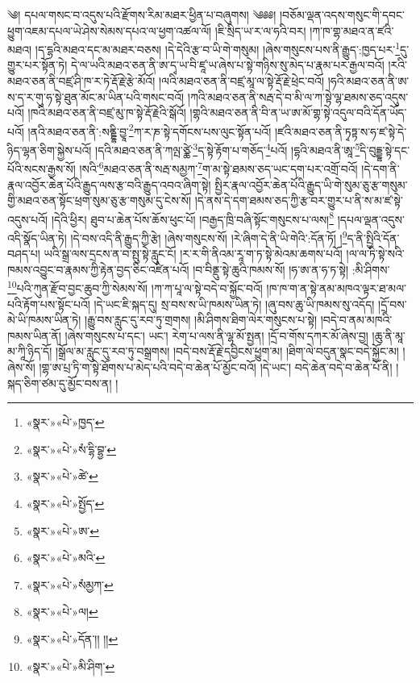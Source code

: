  ༄། དཔལ་གསང་བ་འདུས་པའི་རྫོགས་རིམ་མཐར་ཕྱིན་པ་བཞུགས། ༄༅༅། །བཅོམ་ལྡན་འདས་གསུང་གི་དབང་ཕྱུག་འཇམ་དཔལ་ཡེ་ཤེས་སེམས་དཔའ་ལ་ཕྱག་འཚལ་ལོ། །ཇི་སྲིད་ཡ་ར་ལ་ཧའི་བར། །ཀ་ཁ་གྷ་མཐའ་ན་ཛའི་མཐའ། །ད་དྷའི་མཐའ་དང་མ་མཐར་བཅས། །དེ་དེའི་རྩ་བ་ཡི་གེ་གསུམ། །ཞེས་གསུངས་པས་ནི་རྒྱུད་:ཁྱད་པར་\footnote{«སྣར་»«པེ་»ཁྱད་}དུ་གྱུར་པར་སྟོན་ཏེ། དེ་ལ་ཡའི་མཐའ་ཅན་ནི་ཨ་དྭ་ཡ་བི་ཛཱ་ཡ་ཞེས་པ་སྟེ་གཉིས་སུ་མེད་པ་རྣམ་པར་རྒྱལ་བའོ། །རའི་མཐའ་ཅན་ནི་བཛྲ་ཤི་ཁ་ར་ཏེ་རྡོ་རྗེ་རྩེ་མོའོ། །ལའི་མཐའ་ཅན་ནི་བཛྲ་མཱ་ལ་སྟེ་རྡོ་རྗེ་ཕྲེང་བའོ། །ཧའི་མཐའ་ཅན་ནི་ཨ་ས་ད་ར་གུ་ཧ་སྟེ་ཐུན་མོང་མ་ཡིན་པའི་གསང་བའོ། །ཀའི་མཐའ་ཅན་ནི་སརྦ་དེ་བ་མི་ལ་ཀ་སྟེ་ལྷ་ཐམས་ཅད་འདུས་པའོ། །ཁའི་མཐའ་ཅན་ནི་བཛྲ་མུ་ཁ་སྟེ་རྡོ་རྗེའི་སྒོའོ། །གྷའི་མཐའ་ཅན་ནི་བི་ན་ཡ་ཨ་མོ་གྷ་སྟེ་འདུལ་བའི་དོན་ཡོད་པའོ། །ནའི་མཐའ་ཅན་ནི་:སནྡྷི་བྱཱ་\footnote{«སྣར་»«པེ་»སཾ་དྷི་བྷྱ་}ཀ་ར་ཎ་སྟེ་དགོངས་པས་ལུང་སྟོན་པའོ། །ཛའི་མཐའ་ཅན་ནི་ཏྭཏྟ་ས་ཧ་ཛ་སྟེ་དེ་ཉིད་ལྷན་ཅིག་སྐྱེས་པའོ། །དའི་མཐའ་ཅན་ནི་ཀལྤ་ཙྪེ་\footnote{«སྣར་»«པེ་»ཚེ་}ད་སྟེ་རྟོག་པ་གཅོད་\footnote{«སྣར་»«པེ་»སྤྱོད་}པའོ། །དྷའི་མཐའ་ནི་ཨཱ་\footnote{«སྣར་»«པེ་»ཨ་}དི་བུདྡྷ་སྟེ་དང་པོའི་སངས་རྒྱས་སོ། །སའི་\footnote{«སྣར་»«པེ་»མའི་}མཐའ་ཅན་ནི་སརྦ་སམྱཀ་\footnote{«སྣར་»«པེ་»སཾམྱཀ་}ག་མ་སྟེ་ཐམས་ཅད་ཡང་དག་པར་འགྲོ་བའོ། །དེ་དག་ནི་རྣལ་འབྱོར་ཆེན་པོའི་རྒྱུད་ལས་རྩ་བའི་རྒྱུད་འབའ་ཞིག་སྟེ། སྤྱིར་རྣལ་འབྱོར་ཆེན་པོའི་རྒྱུད་ཡི་གེ་སུམ་ཅུ་རྩ་གསུམ་གྱི་མཐའ་ཅན་སྟོང་ཕྲག་སུམ་ཅུ་རྩ་གསུམ་དུ་ངེས་སོ། །དེ་ནས་དེ་དག་ཐམས་ཅད་ཀྱི་རྩ་བར་གྱུར་པ་ནི་ས་མ་ཛ་སྟེ་འདུས་པའོ། །དེའི་ཕྱིར། ཐུབ་པ་ཆེན་པོས་ཆོས་ཕུང་པོ། །བརྒྱད་ཁྲི་བཞི་སྟོང་གསུངས་པ་ལས།\footnote{«སྣར་»«པེ་»ལ།} །དཔལ་ལྡན་འདུས་འདི་སྣོད་ཡིན་ཏེ། །དེ་བས་འདི་ནི་རྒྱུད་ཀྱི་རྩེ། །ཞེས་གསུངས་སོ། །རེ་ཞིག་དེ་ནི་ཡི་གེའི་:དོན་ཏོ། །\footnote{«སྣར་»«པེ་»དོན་།། །།}ད་ནི་སྤྱིའི་དོན་བཤད་པ། ཡའི་སྒྲ་ལས་དྲངས་ན་བ་སྤུ་སྟེ་རླུང་ངོ། །ར་ར་གི་ནིའམ་རཱ་ག་ཏ་སྟེ་མེའམ་ཆགས་པའོ། །ལ་ལ་ཏི་སྟེ་སའི་ཁམས་འབྱུང་བ་རྣམས་ཀྱི་རྟེན་བྱད་ཅིང་འཛིན་པའོ། །བ་བིནྡུ་སྟེ་ཆུའི་ཁམས་སོ། །ཧ་ཨ་ན་ཧ་ཏ་སྟེ། :མི་ཤིགས་\footnote{«སྣར་»«པེ་»མི་ཤིག་}པའི་ཀུན་རྫོབ་བྱང་ཆུབ་ཀྱི་སེམས་སོ། །ཀ་ཀ་པཱ་ལ་སྟེ་བདེ་བ་སྐྱོང་བའོ། །ཁ་ཁ་ག་ན་སྟེ་ནམ་མཁའ་ལྟར་ཐ་མལ་པའི་རྟོག་པས་སྟོང་པའོ། །དེ་ཡང་ཇི་སྐད་དུ། སྲ་བས་ས་ཡི་ཁམས་ཡིན་ཏེ། །ཞུ་བས་ཆུ་ཡི་ཁམས་སུ་འདོད། །དྲོ་བས་མེ་ཡི་ཁམས་ཡིན་ཏེ། །རྒྱུ་བས་རླུང་དུ་རབ་ཏུ་གྲགས། །མི་ཤིགས་ཐིག་ལེར་གསུངས་པ་སྟེ། །བདེ་བ་ནམ་མཁའི་ཁམས་ཡིན་ནོ། །ཞེས་གསུངས་པ་དང་། ཡང་། རེག་པ་ལས་ནི་ལྷ་མོ་སྤྱན། །དྲོ་བ་གོས་དཀར་མོ་ཞེས་བྱ། །ཆུ་ནི་མཱ་མ་ཀཱི་ཉིད་དོ། །སྒྲོལ་མ་རླུང་དུ་རབ་ཏུ་བསྒྲགས། །བདེ་བས་རྡོ་རྗེ་དབྱིངས་ཕྱུག་མ། །ཐིག་ལེ་བདུན་སྣང་བདེ་སྐྱོང་མ། །ཞེས་སོ། །གྷ་ཨ་པྲ་ཏི་ག་སྟེ་ཐོགས་པ་མེད་པའི་བདེ་བ་ཆེན་པོ་མྱོང་བའོ། །དེ་ཡང་། བདེ་ཆེན་བདེ་བ་ཆེན་པོ་ནི། །སྐད་ཅིག་ཙམ་དུ་མྱོང་བས་ན། །
